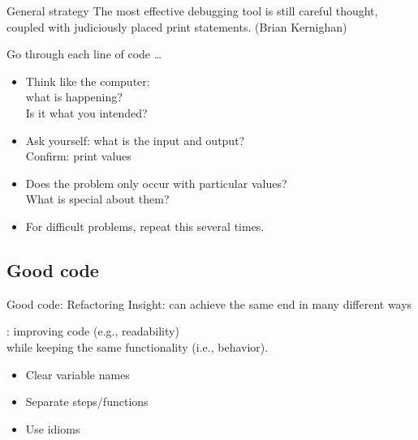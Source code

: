 \documentclass[aspectratio=169,usenames,dvipsnames]{beamer}
\begin{document}
\begin{frame}{General strategy}
    The most effective debugging tool is still careful thought, coupled with
    judiciously placed print statements. (Brian Kernighan)
    
    \pause\vspace{1em}
    Go through each line of code \dots
    \begin{itemize}
        \item Think like the computer: \\
            what is happening? \\
            Is it what you intended?
        \item Ask yourself: what is the input and output? \\
            Confirm: print values
        \item Does the problem only occur with particular values? \\
            What is special about them?
        \item For difficult problems, repeat this several times.
    \end{itemize}
\end{frame}



\subsection{Good code}
\begin{frame}{Good code: Refactoring}
	Insight: can achieve the same end in many different ways

	\pause
	\begin{definition}
		: improving code (e.g., readability) \\
			while keeping the same functionality (i.e., behavior).
	\end{definition}

    \begin{itemize}
        \item Clear variable names
        \item Separate steps/functions
        \item Use idioms
    \end{itemize}
\end{frame}
\end{document}
